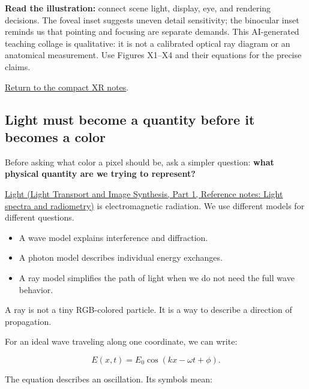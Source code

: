 \textbf{Read the illustration:} connect scene light, display, eye, and rendering decisions. The foveal inset suggests uneven detail sensitivity; the binocular inset reminds us that pointing and focusing are separate demands. This AI-generated teaching collage is qualitative: it is not a calibrated optical ray diagram or an anatomical measurement. Use Figures X1--X4 and their equations for the precise claims.

\hyperref[appendix-73c6b8ed5a87-figure-linked-short-notes]{Return to the compact XR notes}.

\subsection{Light must become a quantity before it becomes a color}\label{04-visual-computing-ii-ch043-light-must-become-a-quantity-before-it-becomes-a-color}

\hypertarget{04-visual-computing-ii-ch043-light-must-become-a-quantity-before-it-becomes-a-color}{}

Before asking what color a pixel should be, ask a simpler question: \textbf{what physical quantity are we trying to represent?}

\href{../04-Light-Transport-and-Image-Synthesis-P01/main.pdf\#nameddest=appendix-215c2570199b}{Light (Light Transport and Image Synthesis, Part 1, Reference notes: Light spectra and radiometry)} is electromagnetic radiation. We use different models for different questions.

\begin{itemize}
\tightlist
\item
  A wave model explains interference and diffraction.
\item
  A photon model describes individual energy exchanges.
\item
  A ray model simplifies the path of light when we do not need the full wave behavior.
\end{itemize}

A ray is not a tiny RGB-colored particle. It is a way to describe a direction of propagation.

For an ideal wave traveling along one coordinate, we can write:

\[
E(x,t)=E_0\cos(kx-\omega t+\phi).
\]

The equation describes an oscillation. Its symbols mean:

